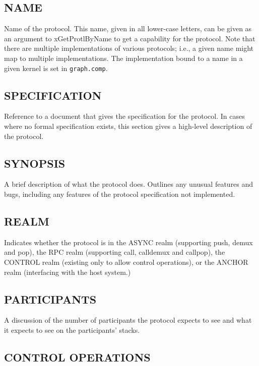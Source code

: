 % 
%
%

\subsection*{NAME}

\noindent Name of the protocol. This name, given in all lower-case letters,
can be given as an argument to {\sanss xGetProtlByName} to get a capability
for the protocol. Note that there are multiple implementations of various
protocols; i.e., a given name might map to multiple implementations. The
implementation bound to a name in a given kernel is set in {\tt graph.comp}.

\subsection*{SPECIFICATION}

\noindent Reference to a document that gives the specification for the
protocol. In cases where no formal specification exists, this section
gives a high-level description of the protocol.

\subsection*{SYNOPSIS}

\noindent A brief description of what the protocol does. Outlines
any unusual features and bugs, including any features of the
protocol specification not implemented.

\subsection*{REALM}

\noindent
Indicates whether the protocol is in the ASYNC realm (supporting
push, demux and pop), the RPC realm (supporting call,
calldemux and callpop), the CONTROL realm (existing only to allow
control operations), or the ANCHOR realm (interfacing with the host
system.) 

\subsection*{PARTICIPANTS}

\noindent 
A discussion of the number of participants the
protocol expects to see and what it expects to see on the
participants' stacks.

\subsection*{CONTROL OPERATIONS}

